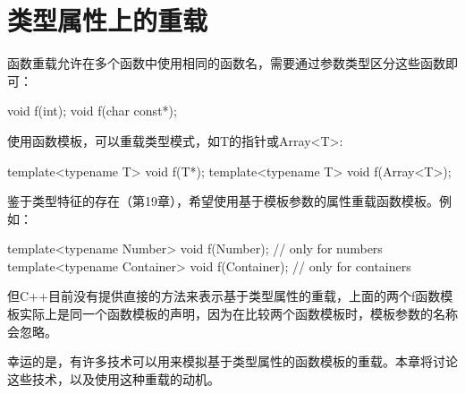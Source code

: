 \chapter{类型属性上的重载}

函数重载允许在多个函数中使用相同的函数名，需要通过参数类型区分这些函数即可：

\begin{cpp}
void f(int);
void f(char const*);
\end{cpp}

使用函数模板，可以重载类型模式，如T的指针或Array<T>:

\begin{cpp}
template<typename T> void f(T*);
template<typename T> void f(Array<T>);
\end{cpp}

鉴于类型特征的存在（第19章），希望使用基于模板参数的属性重载函数模板。例如：

\begin{cpp}
template<typename Number> void f(Number); // only for numbers
template<typename Container> void f(Container); // only for containers
\end{cpp}

但C++目前没有提供直接的方法来表示基于类型属性的重载，上面的两个f函数模板实际上是同一个函数模板的声明，因为在比较两个函数模板时，模板参数的名称会忽略。

幸运的是，有许多技术可以用来模拟基于类型属性的函数模板的重载。本章将讨论这些技术，以及使用这种重载的动机。





































